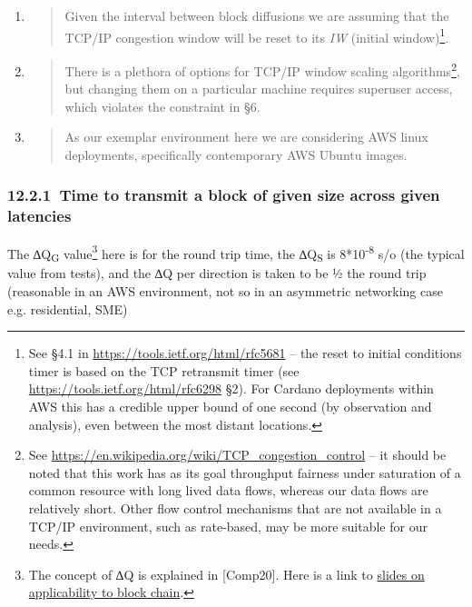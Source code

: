 \documentclass[]{article}
\begin{document}
\begin{enumerate}
\def\labelenumi{\arabic{enumi}.}
\item
  \begin{quote}
  Given the interval between block diffusions we are assuming that the
  TCP/IP congestion window will be reset to its \emph{IW} (initial
  window)\footnote{See §4.1 in
    \href{https://tools.ietf.org/html/rfc5681}{{https://tools.ietf.org/html/rfc5681}}
    -- the reset to initial conditions timer is based on the TCP
    retransmit timer (see
    \href{https://tools.ietf.org/html/rfc6298}{{https://tools.ietf.org/html/rfc6298}}
    §2). For Cardano deployments within AWS this has a credible upper
    bound of one second (by observation and analysis), even between the
    most distant locations.}.
  \end{quote}
\item
  \begin{quote}
  There is a plethora of options for TCP/IP window scaling
  algorithms\footnote{See
    \href{https://en.wikipedia.org/wiki/TCP_congestion_control}{{https://en.wikipedia.org/wiki/TCP\_congestion\_control}}
    -- it should be noted that this work has as its goal throughput
    fairness under saturation of a common resource with long lived data
    flows, whereas our data flows are relatively short. Other flow
    control mechanisms that are not available in a TCP/IP environment,
    such as rate-based, may be more suitable for our needs.}, but
  changing them on a particular machine requires superuser access, which
  violates the constraint in §6.
  \end{quote}
\item
  \begin{quote}
  As our exemplar environment here we are considering AWS linux
  deployments, specifically contemporary AWS Ubuntu images.
  \end{quote}
\end{enumerate}

\hypertarget{time-to-transmit-a-block-of-given-size-across-given-latencies}{%
\subsubsection{​12.2.1​~Time to transmit a block of given size across
given
latencies}\label{time-to-transmit-a-block-of-given-size-across-given-latencies}}

The ∆Q\textbar{}\textsubscript{G} value\footnote{The concept of ∆Q is
  explained in {[}Comp20{]}. Here is a link to
  \href{https://www.slideshare.net/pnsol-slides/q-and-blockchain-83943683}{{slides
  on applicability to block chain}}.} here is for the round trip time,
the ∆Q\textbar{}\textsubscript{S} is 8*10\textsuperscript{-8} s/o (the
typical value from tests), and the ∆Q per direction is taken to be ½ the
round trip (reasonable in an AWS environment, not so in an asymmetric
networking case e.g. residential, SME)
\end{document}
